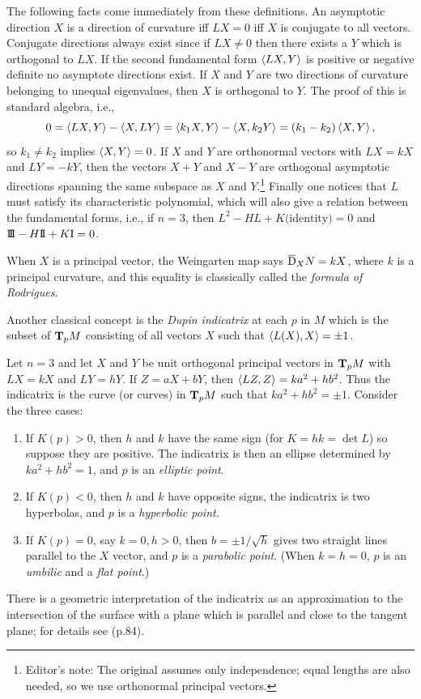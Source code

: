 \documentclass[../main]{subfiles}
\begin{document}
The following facts come immediately from these definitions. An asymptotic direction $X$ is a direction of curvature iff $LX=0$ iff $X$ is conjugate to all vectors. Conjugate directions always exist since if $LX\neq 0$ then there exists a $Y$ which is orthogonal to $LX$. If the second fundamental form $\ip{LX}{Y}$ is positive or negative definite no asymptote directions exist. If $X$ and $Y$ are two directions of curvature belonging to unequal eigenvalues, then $X$ is orthogonal to $Y$. The proof of this is standard algebra, i.e.,
\begin{equation*}
    0=\ip{LX}{Y}-\ip{X}{LY}=\ip{k_1X}{Y}-\ip{X}{k_2Y}=(k_1-k_2)\ip{X}{Y},
\end{equation*}
so $k_1\neq k_2$ implies $\ip{X}{Y}=0$. If $X$ and $Y$ are orthonormal vectors with $LX=kX$ and $LY=-kY$, then the vectors $X+Y$ and $X-Y$ are orthogonal asymptotic directions spanning the same subspace as $X$ and $Y$.\footnote{Editor's note: The original assumes only independence; equal lengths are also needed, so we use orthonormal principal vectors.} Finally one notices that $L$ must satisfy its characteristic polynomial, which will also give a relation between the fundamental forms, i.e., if $n=3$, then $L^2-HL+K\text{(identity)}=0$ and $\thirdForm-H\secondForm+K\firstForm=0$.

When $X$ is a principal vector, the Weingarten map says $\covariant_XN=kX$, where $k$ is a principal curvature, and this equality is classically called the \emph{formula of Rodrigues}.

Another classical concept is the \emph{Dupin indicatrix} at each $p$ in $M$ which is the subset of $\tangentspace{M}{p}$ consisting of all vectors $X$ such that $\ip{L(X)}{X}=\pm 1$.

Let $n=3$ and let $X$ and $Y$ be unit orthogonal principal vectors in $\tangentspace{M}{p}$ with $LX=kX$ and $LY=hY$. If $Z=aX+bY$, then $\ip{LZ}{Z}=ka^2+hb^2$. Thus the indicatrix is the curve (or curves) in $\tangentspace{M}{p}$ such that $ka^2+hb^2=\pm 1$. Consider the three cases:
\begin{enumerate}
    \item If $K(p)>0$, then $h$ and $k$ have the same sign (for $K=hk=\det L$) so suppose they are positive. The indicatrix is then an ellipse determined by $ka^2+hb^2=1$, and $p$ is an \emph{elliptic point}.
    \item If $K(p)<0$, then $h$ and $k$ have opposite signs, the indicatrix is two hyperbolas, and $p$ is a \emph{hyperbolic point}.
    \item If $K(p)=0$, say $k=0,h>0$, then $b=\pm 1/\sqrt{h}$ gives two straight lines parallel to the $X$ vector, and $p$ is a \emph{parabolic point}. (When $k=h=0$, $p$ is an \emph{umbilic} and a \emph{flat point}.)
\end{enumerate}
There is a geometric interpretation of the indicatrix as an approximation to the intersection of the surface with a plane which is parallel and close to the tangent plane; for details see \cite{struik1961lectures} (p.84).
\end{document}
